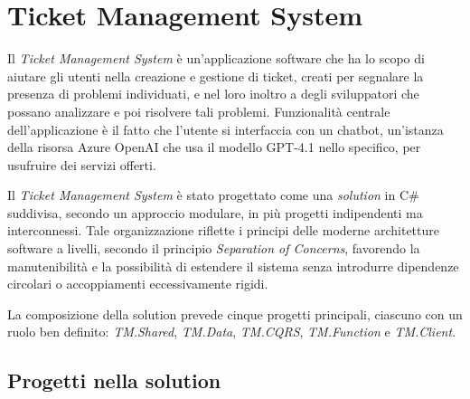 \chapter{Ticket Management System}

Il \textit{Ticket Management System} è un'applicazione software che ha lo scopo di aiutare gli utenti nella creazione e gestione di ticket,
creati per segnalare la presenza di problemi individuati, e nel loro inoltro a degli sviluppatori che possano analizzare e poi risolvere
tali problemi. Funzionalità centrale dell'applicazione è il fatto che l'utente si interfaccia con un chatbot, un'istanza
della risorsa Azure OpenAI che usa il modello GPT-4.1 nello specifico, per usufruire dei servizi offerti.

Il \textit{Ticket Management System} è stato progettato come una \textit{solution} in C\# suddivisa, secondo un approccio modulare,
in più progetti indipendenti ma interconnessi. Tale organizzazione riflette i principi delle moderne architetture software a livelli,
secondo il principio \textit{Separation of Concerns}, favorendo la manutenibilità e la possibilità di estendere il sistema
senza introdurre dipendenze circolari o accoppiamenti eccessivamente rigidi.

La composizione della solution prevede cinque progetti principali, ciascuno con un ruolo ben definito: \textit{TM.Shared}, \textit{TM.Data},
\textit{TM.CQRS}, \textit{TM.Function} e \textit{TM.Client}.

\newpage
\section{Progetti nella solution}

